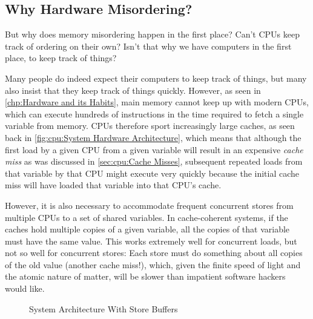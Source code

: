 \subsection{Why Hardware Misordering?}
\label{sec:memorder:Why Hardware Misordering?}

But why does memory misordering happen in the first place?
Can't CPUs keep track of ordering on their own?
Isn't that why we have computers in the first place, to keep track of things?

Many people do indeed expect their computers to keep track of things,
but many also insist that they keep track of things quickly.
However, as seen in \cref{chp:Hardware and its Habits},
main memory cannot keep up with modern CPUs, which can execute
hundreds of instructions in the time required to fetch a single variable
from memory.
CPUs therefore sport increasingly large caches, as seen back in
\cref{fig:cpu:System Hardware Architecture}, which means that
although the first load by a given CPU from a given variable will
result in an expensive \emph{cache miss} as was discussed in
\cref{sec:cpu:Cache Misses}, subsequent
repeated loads from that variable by that CPU might execute
very quickly because the initial cache miss will have loaded that
variable into that CPU's cache.

However, it is also necessary to accommodate frequent concurrent stores
from multiple CPUs to a set of shared variables.
In cache-coherent systems, if the caches hold multiple copies of a given
variable, all the copies of that variable must have the same value.
This works extremely well for concurrent loads, but not so well for
concurrent stores:  Each store must do something about all
copies of the old value (another cache miss!), which, given the finite
speed of light and the atomic nature of matter, will be slower
than impatient software hackers would like.

\begin{figure}
\centering
{}
\caption{System Architecture With Store Buffers}
\label{fig:memorder:System Architecture With Store Buffers}
\end{figure}

